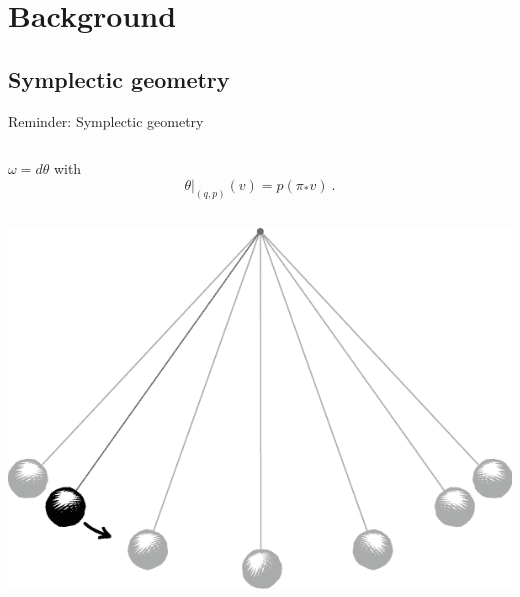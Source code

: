 \documentclass[handout,10pt]{beamer}
\newcommand{\checkpoint}[0]{
	\ifHandout

	\else
	\addtocounter{framenumber}{-1}
 	\begin{frame}{Outline}
  		\tableofcontents[currentsection]
	\end{frame}
	\fi
}
\begin{document}
\section{Background}
\subsection{Symplectic geometry}
\begin{frame}{Reminder: Symplectic geometry}
\begin{columns}[T]
	\begin{column}{.50\linewidth}
		\minipage[c][0.9\textheight][s]{\columnwidth}
		\begin{defblock}
			\vspace{-1em}
				
		\end{defblock}
		\pause
		\begin{exblock}[$M = T^\ast Q$ is symplectic]
			$\omega = d \theta $ with
			$$ \left.\theta\right\vert_{(q,p)} (v) = p (\pi_\ast v) ~.$$
		\end{exblock}
		\begin{columns}
			\begin{column}{.50\linewidth}
				\begin{center}
					\includegraphics[width=0.8\linewidth]{Pictures/pendulum13}			

\end{center}
\end{column}
\end{columns}
\end{column}
\end{columns}
\end{frame}
\end{document}
